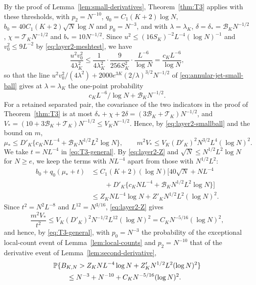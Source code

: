 By the proof of Lemma~\ref{lem:small-derivatives},
Theorem~\ref{thm:T3} applies with these thresholds, with $p_2=N^{-10}$,
$q_0=C_1(K+2)\log N$, $b_0=40C_1(K+2)\sqrt N\log N$ and $p_0=N^{-3}$, and
with $\lambda=\lambda_K$, $\delta=\delta_*=\mathcal B_KN^{-1/2}$,
$\chi=\mathcal T_KN^{-1/2}$ and $b_*=10N^{-1/2}$.
Since $u^2\le(16S_K)^{-2}L^{-4}(\log N)^{-1}$ and $v_0^2\le9L^{-2}$ by
\eqref{eq:layer2-meshtest}, we have
\[
 \frac{u^2v_0^2}{4\lambda_K^2}
 \le\frac1{4\lambda_K^2}\cdot\frac9{256S_K^2}\cdot\frac{L^{-6}}{\log N}
 =\frac{c_KL^{-6}}{\log N},
\]
so that the line
$u^2v_0^2/(4\lambda^2)+2000e^{3K}(2/\lambda)^{3/2}N^{-1/2}$ of
\eqref{eq:annular-jet-small-ball} gives at $\lambda=\lambda_K$ the
one-point probability
\begin{equation}
 c_KL^{-6}/\log N+\mathcal B_KN^{-1/2}.
 \label{eq:layer2-smallball}
\end{equation}
For a retained separated pair, the covariance of the two indicators in
the proof of Theorem~\ref{thm:T3} is at most
$\delta_*+\chi+2\delta=(3\mathcal B_K+\mathcal T_K)N^{-1/2}$, and
$V_*=(10+3\mathcal B_K+\mathcal T_K)N^{-1/2}\le V_KN^{-1/2}$. Hence, by
\eqref{eq:layer2-smallball} and the bound on $m$,
\begin{equation}
 \mu_*\le D'_K\{c_KNL^{-4}+\mathcal B_KN^{1/2}L^2\log N\},\qquad
 m^2V_*\le V_K(D'_K)^2N^{3/2}L^4(\log N)^2.
 \label{eq:layer2-Z}
\end{equation}
We take $t=NL^{-4}$ in \eqref{eq:T3-general}. By \eqref{eq:layer2-Z}
and $\sqrt N\le N^{1/2}L^2\log N$ for $N\ge e$, we keep the terms with
$NL^{-4}$ apart from those with $N^{1/2}L^2$:
\begin{align*}
 b_0+q_0(\mu_*+t)
 &\le C_1(K+2)(\log N)\bigl[40\sqrt N+NL^{-4}\\
 &\qquad+D'_K\{c_KNL^{-4}+\mathcal B_KN^{1/2}L^2\log N\}\bigr]\\
 &\le Z_KNL^{-4}\log N+Z'_KN^{1/2}L^2(\log N)^2.
\end{align*}
Since $t^2=N^2L^{-8}$ and $L^{12}=N^{3/16}$, \eqref{eq:layer2-Z} gives
\[
 \frac{m^2V_*}{t^2}
 \le V_K(D'_K)^2N^{-1/2}L^{12}(\log N)^2
 =C_KN^{-5/16}(\log N)^2,
\]
and hence, by \eqref{eq:T3-general}, with $p_0=N^{-3}$ the probability
of the exceptional local-count event of Lemma~\ref{lem:local-counts} and
$p_2=N^{-10}$ that of the derivative event of
Lemma~\ref{lem:second-derivative},
\begin{equation}
 \begin{aligned}
 &\mathbb P\{B_{K,N}>Z_KNL^{-4}\log N+Z'_KN^{1/2}L^2(\log N)^2\}\\
 &\qquad\le N^{-3}+N^{-10}+C_KN^{-5/16}(\log N)^2.
 \end{aligned}
 \label{eq:layer2-bad}
\end{equation}
